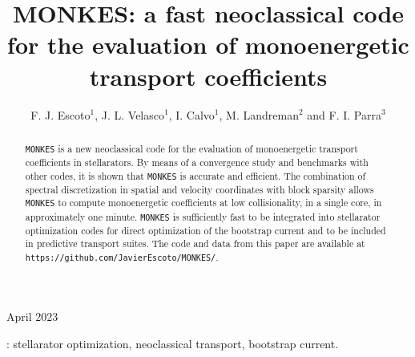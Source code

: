 \documentclass[10pt]{iopart}
\newcommand{\MONKES}{{\texttt{MONKES}}}
\begin{document}
\title[MONKES: a fast neoclassical code for the evaluation of monoenergetic transport coefficients]{MONKES: a fast neoclassical code for the evaluation of monoenergetic transport coefficients}

\author{F. J. Escoto$^1$, J. L. Velasco$^1$, I. Calvo$^1$, M. Landreman$^2$ and F. I. Parra$^3$}
\address{$^1$Laboratorio Nacional de Fusión, CIEMAT, 28040 Madrid, Spain}
\address{$^2$University of Maryland, College Park, MD 20742, USA}
\address{$^3$Princeton Plasma Physics Laboratory, Princeton, NJ 08540, USA}
\vspace{10pt}
\begin{indented}
\item[]April 2023
\end{indented}

\begin{abstract}
	{\MONKES} is a new neoclassical code for the evaluation of monoenergetic transport coefficients in stellarators. By means of a convergence study and benchmarks with other codes, it is shown that {\MONKES} is accurate and efficient. The combination of spectral discretization in spatial and velocity coordinates with block sparsity allows {\MONKES} to compute monoenergetic coefficients at low collisionality, in a single core, in approximately one minute. {\MONKES} is sufficiently fast to be integrated into stellarator optimization codes for direct optimization of the bootstrap current and to be included in predictive transport suites. The code and data from this paper are available at \texttt{https://github.com/JavierEscoto/MONKES/}.   
\end{abstract}

%
\vspace{2pc}
: stellarator optimization, neoclassical transport,  bootstrap current.
%
\submitto{\NF}
%
% 
\ioptwocol
%
\end{document}
